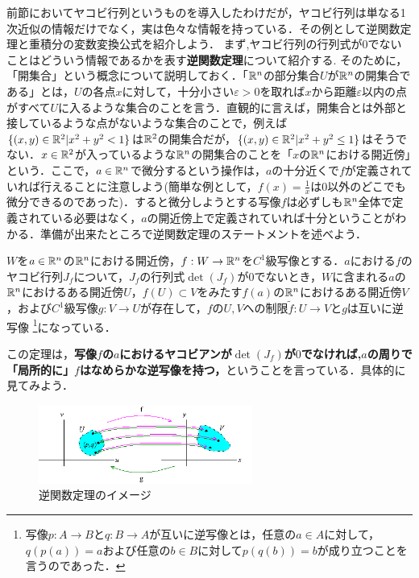 前節においてヤコビ行列というものを導入したわけだが，ヤコビ行列は単なる1次近似の情報だけでなく，実は色々な情報を持っている．その例として逆関数定理と重積分の変数変換公式を紹介しよう．
まず,ヤコビ行列の行列式が$0$でないことはどういう情報であるかを表す\textbf{逆関数定理}について紹介する.
そのために，「開集合」という概念について説明しておく．「${\mathbb R}^n$の部分集合$U$が${\mathbb R}^n$の開集合である」とは，$U$の各点$x$に対して，十分小さい$\varepsilon>0$を取れば$x$から距離$\varepsilon$以内の点がすべて$U$に入るような集合のことを言う．直観的に言えば，開集合とは外部と接しているような点がないような集合のことで，例えば$\{(x,y)\in{\mathbb R}^2|x^2+y^2<1\}$は${\mathbb R}^2$の開集合だが，$\{(x,y)\in{\mathbb R}^2|x^2+y^2\le1\}$はそうでない．$x\in{\mathbb R}^2$が入っているような${\mathbb R}^n$の開集合のことを「$x$の${\mathbb R}^n$における開近傍」という．ここで，$a\in{\mathbb R}^n$で微分するという操作は，$a$の十分近くで$f$が定義されていれば行えることに注意しよう(簡単な例として，$f(x)=\frac{1}{x}$は0以外のどこでも微分できるのであった)．すると微分しようとする写像$f$は必ずしも${\mathbb R}^n$全体で定義されている必要はなく，$a$の開近傍上で定義されていれば十分ということがわかる．準備が出来たところで逆関数定理のステートメントを述べよう．
\begin{s_theo}[逆関数定理]
$W$を$a\in{\mathbb R}^n$の${\mathbb R}^n$における開近傍，$f:W\rightarrow{\mathbb R}^n$を$C^1$級写像とする．$a$における$f$のヤコビ行列$J_f$について，$J_f$の行列式$\det(J_f)$が0でないとき，$W$に含まれる$a$の${\mathbb R}^n$におけるある開近傍$U$，$f(U)\subset V$をみたす$f(a)$の${\mathbb R}^n$におけるある開近傍$V$，および$C^1$級写像$g:V\rightarrow U$が存在して，$f$の$U,V$への制限$\tilde{f}:U\rightarrow V$と$g$は互いに逆写像
\footnote{写像$p:A\rightarrow B$と$q:B\rightarrow A$が互いに逆写像とは，任意の$a\in A$に対して，$q(p(a))=a$および任意の$b\in B$に対して$p(q(b))=b$が成り立つことを言うのであった．}になっている．
\end{s_theo}
この定理は，\textbf{写像$f$の$a$におけるヤコビアンが$\det(J_f)$が$0$でなければ,$a$の周りで「局所的に」$f$はなめらかな逆写像を持つ，}ということを言っている．具体的に見てみよう．
\begin{figure}[h]
  \begin{center} 
    \includegraphics[width=7.0cm]{dev_invfunc}
    \caption{逆関数定理のイメージ}
  \end{center}
\end{figure}
